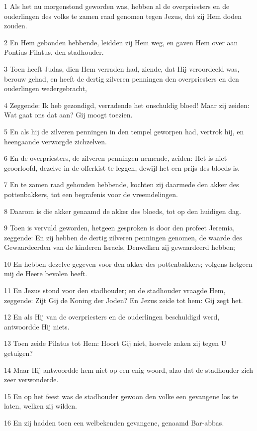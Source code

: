 \par 1 Als het nu morgenstond geworden was, hebben al de overpriesters en de ouderlingen des volks te zamen raad genomen tegen Jezus, dat zij Hem doden zouden.
\par 2 En Hem gebonden hebbende, leidden zij Hem weg, en gaven Hem over aan Pontius Pilatus, den stadhouder.
\par 3 Toen heeft Judas, dien Hem verraden had, ziende, dat Hij veroordeeld was, berouw gehad, en heeft de dertig zilveren penningen den overpriesters en den ouderlingen wedergebracht,
\par 4 Zeggende: Ik heb gezondigd, verradende het onschuldig bloed! Maar zij zeiden: Wat gaat ons dat aan? Gij moogt toezien.
\par 5 En als hij de zilveren penningen in den tempel geworpen had, vertrok hij, en heengaande verworgde zichzelven.
\par 6 En de overpriesters, de zilveren penningen nemende, zeiden: Het is niet geoorloofd, dezelve in de offerkist te leggen, dewijl het een prijs des bloeds is.
\par 7 En te zamen raad gehouden hebbende, kochten zij daarmede den akker des pottenbakkers, tot een begrafenis voor de vreemdelingen.
\par 8 Daarom is die akker genaamd de akker des bloeds, tot op den huidigen dag.
\par 9 Toen is vervuld geworden, hetgeen gesproken is door den profeet Jeremia, zeggende: En zij hebben de dertig zilveren penningen genomen, de waarde des Gewaardeerden van de kinderen Israels, Denwelken zij gewaardeerd hebben;
\par 10 En hebben dezelve gegeven voor den akker des pottenbakkers; volgens hetgeen mij de Heere bevolen heeft.
\par 11 En Jezus stond voor den stadhouder; en de stadhouder vraagde Hem, zeggende: Zijt Gij de Koning der Joden? En Jezus zeide tot hem: Gij zegt het.
\par 12 En als Hij van de overpriesters en de ouderlingen beschuldigd werd, antwoordde Hij niets.
\par 13 Toen zeide Pilatus tot Hem: Hoort Gij niet, hoevele zaken zij tegen U getuigen?
\par 14 Maar Hij antwoordde hem niet op een enig woord, alzo dat de stadhouder zich zeer verwonderde.
\par 15 En op het feest was de stadhouder gewoon den volke een gevangene los te laten, welken zij wilden.
\par 16 En zij hadden toen een welbekenden gevangene, genaamd Bar-abbas.
